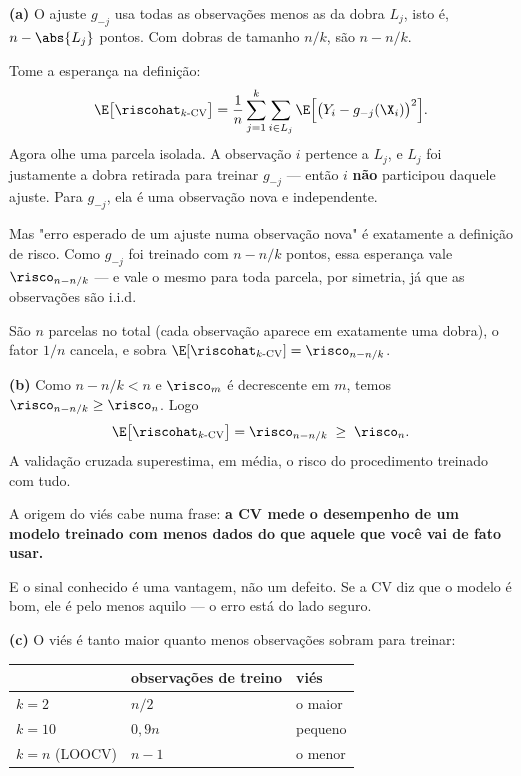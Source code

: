 \begin{solucao}
\textbf{(a)} O ajuste $g_{-j}$ usa todas as observações menos as da dobra $L_j$,
isto é, $n-\abs{L_j}$ pontos. Com dobras de tamanho $n/k$, são $n-n/k$.

Tome a esperança na definição:
\[
  \E\big[\riscohat_{k\text{-CV}}\big]
   = \frac1n\sum_{j=1}^{k}\sum_{i\in L_j}
     \E\Big[\big(Y_i-g_{-j}(\X_i)\big)^2\Big].
\]
Agora olhe uma parcela isolada. A observação $i$ pertence a $L_j$, e $L_j$ foi
justamente a dobra retirada para treinar $g_{-j}$ --- então $i$ \textbf{não}
participou daquele ajuste. Para $g_{-j}$, ela é uma observação nova e
independente.

Mas "erro esperado de um ajuste numa observação nova" é exatamente a definição de
risco. Como $g_{-j}$ foi treinado com $n-n/k$ pontos, essa esperança vale
$\risco_{n-n/k}$ --- e vale o mesmo para toda parcela, por simetria, já que as
observações são i.i.d.

São $n$ parcelas no total (cada observação aparece em exatamente uma dobra), o
fator $1/n$ cancela, e sobra $\E[\riscohat_{k\text{-CV}}]=\risco_{n-n/k}$.

\smallskip
\textbf{(b)} Como $n-n/k<n$ e $\risco_m$ é decrescente em $m$, temos
$\risco_{n-n/k}\ge\risco_n$. Logo
\[
  \E\big[\riscohat_{k\text{-CV}}\big] = \risco_{n-n/k} \;\ge\; \risco_n .
\]
A validação cruzada superestima, em média, o risco do procedimento treinado com
tudo.

A origem do viés cabe numa frase: \textbf{a CV mede o desempenho de um modelo
treinado com menos dados do que aquele que você vai de fato usar.}

E o sinal conhecido é uma vantagem, não um defeito. Se a CV diz que o modelo é
bom, ele é pelo menos aquilo --- o erro está do lado seguro.

\smallskip
\textbf{(c)} O viés é tanto maior quanto menos observações sobram para treinar:

\begin{center}\small
\begin{tabular}{@{}lll@{}}
\toprule
 & observações de treino & viés \\
\midrule
$k=2$   & $n/2$    & o maior \\
$k=10$  & $0{,}9n$ & pequeno \\
$k=n$ (LOOCV) & $n-1$ & o menor \\
\bottomrule
\end{tabular}
\end{center}


\end{solucao}
